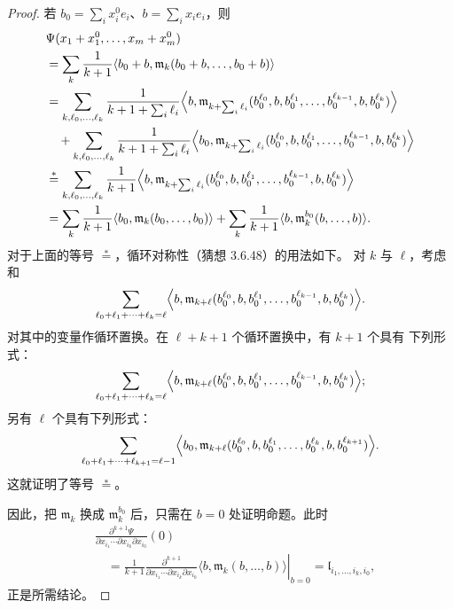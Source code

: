 \begin{proof}
若 $b_0=\sum_i x_i^0e_i$、$b=\sum_i x_i e_i$，则
\[
\begin{aligned}
&\Psi(x_1+x_1^0,\ldots,x_m+x_m^0)\\
&=\sum_k\frac{1}{k+1}
  \langle b_0+b,\mathfrak m_k(b_0+b,\ldots,b_0+b)\rangle\\
&=\sum_{k,\ell_0,\ldots,\ell_k}
  \frac{1}{k+1+\sum_i\ell_i}
  \Bigl\langle b,
  \mathfrak m_{k+\sum_i\ell_i}
  (b_0^{\ell_0},b,b_0^{\ell_1},\ldots,
   b_0^{\ell_{k-1}},b,b_0^{\ell_k})\Bigr\rangle\\
&\quad+
  \sum_{k,\ell_0,\ldots,\ell_k}
  \frac{1}{k+1+\sum_i\ell_i}
  \Bigl\langle b_0,
  \mathfrak m_{k+\sum_i\ell_i}
  (b_0^{\ell_0},b,b_0^{\ell_1},\ldots,
   b_0^{\ell_{k-1}},b,b_0^{\ell_k})\Bigr\rangle\\
&\mathrel{\overset{*}{=}}
  \sum_{k,\ell_0,\ldots,\ell_k}
  \frac{1}{k+1}
  \Bigl\langle b,
  \mathfrak m_{k+\sum_i\ell_i}
  (b_0^{\ell_0},b,b_0^{\ell_1},\ldots,
   b_0^{\ell_{k-1}},b,b_0^{\ell_k})\Bigr\rangle\\
&=\sum_k\frac{1}{k+1}
  \langle b_0,\mathfrak m_k(b_0,\ldots,b_0)\rangle
  +\sum_k\frac{1}{k+1}
  \langle b,\mathfrak m_k^{b_0}(b,\ldots,b)\rangle.
\end{aligned}
\]
对于上面的等号 $\overset{*}{=}$，循环对称性（猜想 3.6.48）的用法如下。
对 $k$ 与 $\ell$，考虑和
\[
  \sum_{\ell_0+\ell_1+\cdots+\ell_k=\ell}
  \Bigl\langle b,
  \mathfrak m_{k+\ell}
  (b_0^{\ell_0},b,b_0^{\ell_1},\ldots,
   b_0^{\ell_{k-1}},b,b_0^{\ell_k})\Bigr\rangle.
\]
对其中的变量作循环置换。在 $\ell+k+1$ 个循环置换中，有 $k+1$ 个具有
下列形式：
\[
  \sum_{\ell_0+\ell_1+\cdots+\ell_k=\ell}
  \Bigl\langle b,
  \mathfrak m_{k+\ell}
  (b_0^{\ell_0},b,b_0^{\ell_1},\ldots,
   b_0^{\ell_{k-1}},b,b_0^{\ell_k})\Bigr\rangle;
\]
另有 $\ell$ 个具有下列形式：
\[
  \sum_{\ell_0+\ell_1+\cdots+\ell_{k+1}=\ell-1}
  \Bigl\langle b_0,
  \mathfrak m_{k+\ell}
  (b_0^{\ell_0},b,b_0^{\ell_1},\ldots,
   b_0^{\ell_k},b,b_0^{\ell_{k+1}})\Bigr\rangle.
\]
这就证明了等号 $\overset{*}{=}$。

因此，把 $\mathfrak m_k$ 换成 $\mathfrak m_k^{b_0}$ 后，只需在 $b=0$
处证明命题。此时
\[
\begin{aligned}
  &\frac{\partial^{k+1}\Psi}
  {\partial x_{i_1}\cdots\partial x_{i_k}\partial x_{i_0}}(0)\\
  &\quad={}
  \left.
  \frac{1}{k+1}
  \frac{\partial^{k+1}}
  {\partial x_{i_1}\cdots\partial x_{i_k}\partial x_{i_0}}
  \langle b,\mathfrak m_k(b,\ldots,b)\rangle
  \right|_{b=0}
  =\mathfrak l_{i_1,\ldots,i_k,i_0},
\end{aligned}
\]
正是所需结论。
\end{proof}


